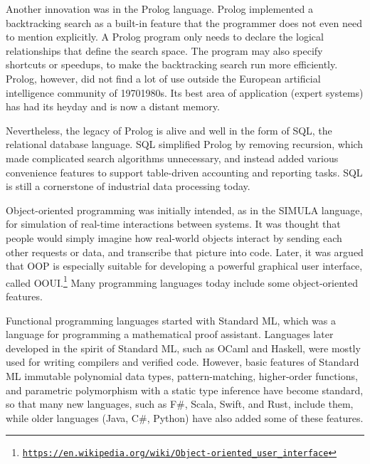 Another innovation was in the Prolog language. Prolog implemented
a backtracking search as a built-in feature that the programmer does
not even need to mention explicitly. A Prolog program only needs to
declare the logical relationships that define the search space. The
program may also specify shortcuts or speedups, to make the backtracking
search run more efficiently. Prolog, however, did not find a lot of
use outside the European artificial intelligence community of 1970\textendash 1980s.
Its best area of application (expert systems) has had its heyday and
is now a distant memory.

Nevertheless, the legacy of Prolog is alive and well in the form of
SQL, the relational database language. SQL simplified Prolog by removing
recursion, which made complicated search algorithms unnecessary, and
instead added various convenience features to support table-driven
accounting and reporting tasks. SQL is still a cornerstone of industrial
data processing today.

Object-oriented programming was initially intended, as in the SIMULA
language, for simulation of real-time interactions between systems.
It was thought that people would simply imagine how real-world objects
interact by sending each other requests or data, and transcribe that
picture into code. Later, it was argued that OOP is especially suitable
for developing a powerful graphical user interface, called OOUI.\footnote{\texttt{\href{https://en.wikipedia.org/wiki/Object-oriented_user_interface}{https://en.wikipedia.org/wiki/Object-oriented\_user\_interface}}}
Many programming languages today include some object-oriented features.

Functional programming languages started with Standard ML, which was
a language for programming a mathematical proof assistant. Languages
later developed in the spirit of Standard ML, such as OCaml and Haskell,
were mostly used for writing compilers and verified code. However,
basic features of Standard ML \textemdash{} immutable polynomial data
types, pattern-matching, higher-order functions, and parametric polymorphism
with a static type inference \textemdash{} have become standard, so
that many new languages, such as F\#, Scala, Swift, and Rust, include
them, while older languages (Java, C\#, Python) have also added some
of these features. 


